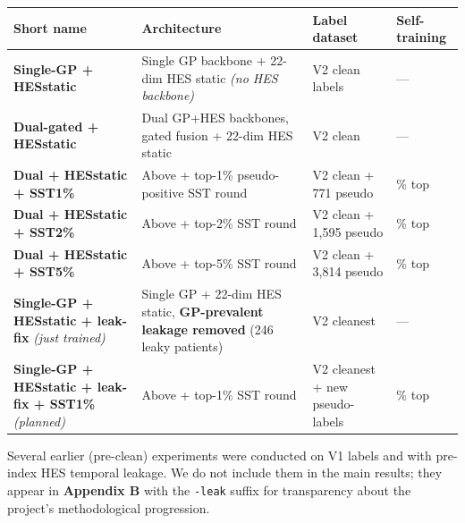 \documentclass[
  11pt,
]{article}
\newcommand{\passthrough}[1]{#1}
\newcounter{none} %
\begin{document}
{\def\LTcaptype{none} %
\begin{longtable}[]{|>{\raggedright\arraybackslash}p{}|>{\raggedright\arraybackslash}p{}|>{\raggedright\arraybackslash}p{}|>{\raggedright\arraybackslash}p{}|}
\hline
\begin{minipage}[b]{\linewidth}\raggedright
Short name
\end{minipage} & \begin{minipage}[b]{\linewidth}\raggedright
Architecture
\end{minipage} & \begin{minipage}[b]{\linewidth}\raggedright
Label dataset
\end{minipage} & \begin{minipage}[b]{\linewidth}\raggedright
Self-training
\end{minipage} \\
\hline
\hline
\endhead
\hline
\endlastfoot
\textbf{Single-GP + HESstatic} & Single GP backbone + 22-dim HES static
\emph{(no HES backbone)} & V2 clean labels & --- \\
\hline
\textbf{Dual-gated + HESstatic} & Dual GP+HES backbones, gated fusion +
22-dim HES static & V2 clean & --- \\
\hline
\textbf{Dual + HESstatic + SST1\%} & Above + top-1\% pseudo-positive SST
round & V2 clean + 771 pseudo & 1\% top \\
\hline
\textbf{Dual + HESstatic + SST2\%} & Above + top-2\% SST round & V2
clean + 1,595 pseudo & 2\% top \\
\hline
\textbf{Dual + HESstatic + SST5\%} & Above + top-5\% SST round & V2
clean + 3,814 pseudo & 5\% top \\
\hline
\textbf{Single-GP + HESstatic + leak-fix} \emph{(just trained)} & Single
GP + 22-dim HES static, \textbf{GP-prevalent leakage removed} (246 leaky
patients) & V2 cleanest & --- \\
\hline
\textbf{Single-GP + HESstatic + leak-fix + SST1\%} \emph{(planned)} &
Above + top-1\% SST round & V2 cleanest + new pseudo-labels & 1\% top \\
\hline
\end{longtable}
}

Several earlier (pre-clean) experiments were conducted on V1 labels and
with pre-index HES temporal leakage. We do not include them in the main
results; they appear in \textbf{Appendix B} with the
\passthrough{\lstinline!-leak!} suffix for transparency about the
project's methodological progression.
\end{document}
